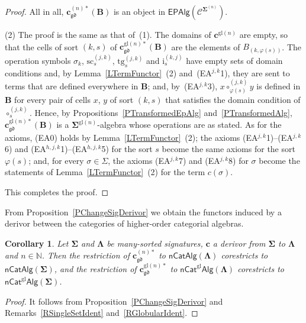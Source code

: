 \documentclass[a4paper, reqno
]{amsart}
\newcommand{\sig}[1]{\mathbf{#1}}             %
\newcommand{\spec}[1]{\boldsymbol{\mathcal{#1}}} %
\newcommand{\gd}{\mathfrak{gd}}              %
\newcommand{\gl}{\mathrm{gl}}                %
\newcommand{\src}{\mathrm{sc}}
\newcommand{\tgt}{\mathrm{tg}}
\theoremstyle{plain}
\newtheorem{corollary}[theorem]{Corollary}
\theoremstyle{definition}
\begin{document}
\begin{proof}
All in all, $\mathbf{c}^{(n)\ast}_{\gd}(\mathbf{B})$ is an object in $\mathsf{EPAlg}(\spec{C}^{\sig{\Sigma}^{(n)}})$.

(2) The proof is the same as that of~(1).
The domains of $\mathbf{c}^{\gl(n)}$ are empty, so that the cells of sort $(k,s)$ of $\mathbf{c}^{\gl(n)\ast}_{\gd}(\mathbf{B})$ are the elements of $B_{(k,\varphi(s))}$.
The operation symbols $\sigma_{k}$, $\src^{(j,k)}_{s}$, $\tgt^{(j,k)}_{s}$ and $\mathrm{i}^{(k,j)}_{s}$ have empty sets of domain conditions and, by Lemma~\ref{LTermFunctor}~(2) and~(EA$^{j,k}$1), they are sent to terms that are defined everywhere in $\mathbf{B}$; and, by~(EA$^{j,k}$3), $x\circ^{(j,k)}_{\varphi(s)}y$ is defined in $\mathbf{B}$ for every pair of cells $x$, $y$ of sort $(k,s)$ that satisfies the domain condition of $\circ^{(j,k)}_{s}$.
Hence, by Propositions~\ref{PTransformedEpAlg} and~\ref{PTransformedAlg}, $\mathbf{c}^{\gl(n)\ast}_{\gd}(\mathbf{B})$ is a $\sig{\Sigma}^{\gl(n)}$-algebra whose operations are as stated.
As for the axioms, (EA0) holds by Lemma~\ref{LTermFunctor}~(2); the axioms (EA$^{j,k}$1)--(EA$^{j,k}$6) and (EA$^{h,j,k}$1)--(EA$^{h,j,k}$5) for the sort $s$ become the same axioms for the sort $\varphi(s)$; and, for every $\sigma\in\Sigma$, the axioms (EA$^{j,k}$7) and (EA$^{j,k}$8) for $\sigma$ become the statements of Lemma~\ref{LTermFunctor}~(2) for the term $c(\sigma)$.

This completes the proof.
\end{proof}

From Proposition~\ref{PChangeSigDerivor} we obtain the functors induced by a derivor between the categories of higher-order categorial algebras.

\begin{corollary}\label{CChangeSigFunctor}
Let $\sig{\Sigma}$ and $\sig{\Lambda}$ be many-sorted signatures, $\mathbf{c}$ a derivor from $\sig{\Sigma}$ to $\sig{\Lambda}$ and $n\in\mathbb{N}$.
Then the restriction of $\mathbf{c}^{(n)\ast}_{\gd}$ to $\mathsf{nCatAlg}(\sig{\Lambda})$ corestricts to $\mathsf{nCatAlg}(\sig{\Sigma})$, and the restriction of $\mathbf{c}^{\gl(n)\ast}_{\gd}$ to $\mathsf{nCat}^{\gl}\mathsf{Alg}(\sig{\Lambda})$ corestricts to $\mathsf{nCat}^{\gl}\mathsf{Alg}(\sig{\Sigma})$.
\end{corollary}
\begin{proof}
It follows from Proposition~\ref{PChangeSigDerivor} and Remarks~\ref{RSingleSetIdent} and~\ref{RGlobularIdent}.
\end{proof}
\end{document}
